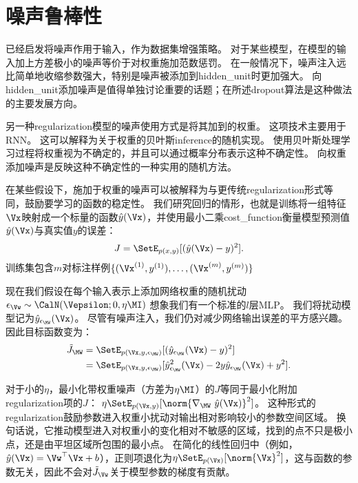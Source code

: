 
\section{噪声鲁棒性}
\label{sec:noise_robustness}

已经启发将噪声作用于输入，作为数据集增强策略。
对于某些模型，在模型的输入加上方差极小的噪声等价于对权重施加范数惩罚\citep{Bishop1995,bishop95training}。
在一般情况下，噪声注入远比简单地收缩参数强大，特别是噪声被添加到\gls{hidden_unit}时更加强大。
向\gls{hidden_unit}添加噪声是值得单独讨论重要的话题；在所述\gls{dropout}算法是这种做法的主要发展方向。

另一种\gls{regularization}模型的噪声使用方式是将其加到的权重。
这项技术主要用于\gls{RNN}\citep{JimGilesHorne1996,Graves-2011}。
这可以解释为关于权重的贝叶斯\gls{inference}的随机实现。
使用贝叶斯处理学习过程将权重视为不确定的，并且可以通过概率分布表示这种不确定性。
向权重添加噪声是反映这种不确定性的一种实用的随机方法。

在某些假设下，施加于权重的噪声可以被解释为与更传统\gls{regularization}形式等同，鼓励要学习的函数的稳定性。
我们研究回归的情形，也就是训练将一组特征$\Vx$映射成一个标量的函数$\hat y(\Vx)$，并使用最小二乘\gls{cost_function}衡量模型预测值$\hat y(\Vx)$与真实值$y$的误差：
\begin{align}
 J = \SetE_{p(x,y)}[(\hat y(\Vx) - y)^2].
\end{align}
训练集包含$m$对标注样例$\{(\Vx^{(1)}, y^{(1)}),\dots,(\Vx^{(m)}, y^{(m)})\}$

现在我们假设在每个输入表示上添加网络权重的随机扰动$\epsilon_{\Vw} \sim \CalN(\Vepsilon;0, \eta\MI )$
想象我们有一个标准的$l$层MLP。
我们将扰动模型记为$\hat y_{\epsilon_{\MW}} (\Vx)$。
尽管有噪声注入，我们仍对减少网络输出误差的平方感兴趣。
因此目标函数变为：
\begin{align}
 \tilde J_{\MW} &= \SetE_{p(\Vx,y,\epsilon_{\MW})}[(\hat y_{\epsilon_{\MW}}(\Vx) - y)^2] \\
   &=  \SetE_{p(\Vx,y,\epsilon_{\MW})}[\hat y_{\epsilon_{\MW}}^2(\Vx) -  2y\hat y_{\epsilon_{\MW}}
   (\Vx)+ y^2] .
\end{align}

对于小的$\eta$，最小化带权重噪声（方差为$\eta \MI$）的$J$等同于最小化附加\gls{regularization}项的$J$：
$ \eta \SetE_{p(\Vx,y)}[\norm{\nabla_{\MW}~\hat y(\Vx)}^2]$。
这种形式的\gls{regularization}鼓励参数进入权重小扰动对输出相对影响较小的参数空间区域。
换句话说，它推动模型进入对权重小的变化相对不敏感的区域，找到的点不只是极小点，还是由平坦区域所包围的最小点\citep{Hochreiter95}。
在简化的线性回归中（例如，$\hat y(\Vx) = \Vw^\top \Vx + b$），正则项退化为$ \eta \SetE_{p(\Vx)}[\norm{\Vx}^2]$，这与函数的参数无关，因此不会对$\tilde J_{\Vw}$关于模型参数的梯度有贡献。

